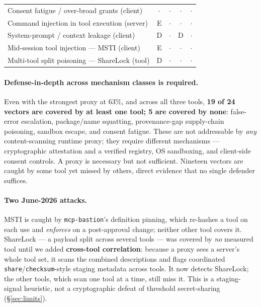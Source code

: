 \documentclass[11pt]{article}
\newcommand{\code}[1]{\texttt{\small #1}}
\begin{document}
\begin{table}[t]
\begin{tabularx}{\linewidth}{@{}Xcccc@{}}
Consent fatigue / over-broad grants (client) & $\cdot$ & $\cdot$ & $\cdot$ & $\cdot$ \\
Command injection in tool execution (server) & E & $\cdot$ & $\cdot$ & $\cdot$ \\
System-prompt / context leakage (client) & D & $\cdot$ & D & $\cdot$ \\
Mid-session tool injection --- MSTI (client) & E & $\cdot$ & $\cdot$ & $\cdot$ \\
Multi-tool split poisoning --- ShareLock (tool) & D & $\cdot$ & $\cdot$ & $\cdot$ \\
\bottomrule
\end{tabularx}
\end{table}

\paragraph{Defense-in-depth across mechanism classes is required.} Even with the strongest proxy at 63\%, and across all three tools, \textbf{19 of 24 vectors are covered by at least one tool; 5 are covered by none}: false-error escalation, package/name squatting, provenance-gap supply-chain poisoning, sandbox escape, and consent fatigue. These are not addressable by \emph{any} content-scanning runtime proxy; they require different mechanisms --- cryptographic attestation and a verified registry, OS sandboxing, and client-side consent controls. A proxy is necessary but not sufficient. Nineteen vectors are caught by some tool yet missed by others, direct evidence that no single defender suffices.

\paragraph{Two June-2026 attacks.} MSTI is caught by \code{mcp-bastion}'s definition pinning, which re-hashes a tool on each use and \emph{enforces} on a post-approval change; neither other tool covers it. ShareLock --- a payload split across several tools --- was covered by \emph{no} measured tool until we added \textbf{cross-tool correlation}: because a proxy sees a server's whole tool set, it scans the combined descriptions and flags coordinated \code{share}/\code{checksum}-style staging metadata across tools. It now detects ShareLock; the other tools, which scan one tool at a time, still miss it. This is a staging-signal heuristic, not a cryptographic defeat of threshold secret-sharing (\S\ref{sec:limits}).
\end{document}
